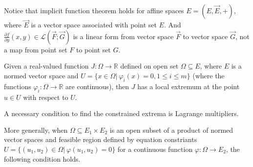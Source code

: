 \documentclass[a4paper,12pt]{report}
\begin{document}
Notice that implicit function theorem holds for affine spaces $E=(E,\vec E,+)$, where $\vec E$ is a vector space associated with point set $E$. And $\frac{\partial f}{\partial y}(x,y)\in \mathcal L (\vec F;\vec G)$ is a linear form from vector space $\vec F$ to vector space $\vec G$, not a map from point set $F$ to point set $G$.

Given a real-valued function $J:\Omega\to\mathbb R$ defined on open set $\Omega\subseteq E$, where $E$ is a normed vector space and $U=\{x\in\Omega |\ \varphi_i(x)=0, 1\leq i\leq m\}$ (where the functions $\varphi_i:\Omega\to\mathbb R$ are continuous), then $J$ has a local extremum at the point $u\in U$ with respect to $U$.

A necessary condition to find the constrained extrema is Lagrange multipliers.

More generally, when $\Omega\subseteq E_1\times E_2$ is an open subset of a product of normed vector spaces and feasible region defined by equation constriants $U=\{(u_1,u_2)\in\Omega |\  \varphi(u_1,u_2)=0\}$ for a continuous function $\varphi:\Omega\to E_2$, the following condition holds.
\end{document}
